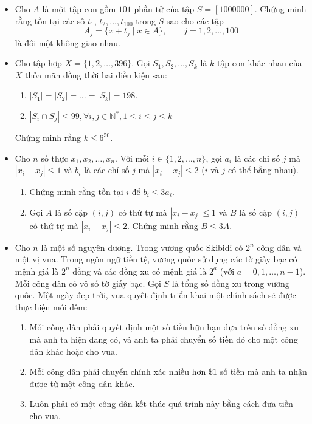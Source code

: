 \documentclass[11pt]{scrartcl}
\begin{document}
\begin{itemize}[label=, leftmargin=0em, itemsep=-0em]
    \item \begin{btvn}
        Cho $A$ là một tập con gồm $101$ phần tử của tập $S=[1000000]$. Chứng minh rằng tồn tại các số $t_1$, $t_2, \ldots, t_{100}$ trong $S$ sao cho các tập\[ A_j=\{x+t_j\mid x\in A\},\qquad j=1,2,\ldots,100  \]là đôi một không giao nhau.
    \end{btvn}
    \item \begin{btvn}
        Cho tập hợp $X = \{1,2,\dots,396\}$. Gọi $S_1,S_2,\dots,S_k$ là $k$ tập con khác nhau của $X$ thỏa mãn đồng thời hai điều kiện sau:
        \begin{enumerate}
            \item $|S_1| = |S_2| = \dots = |S_k| = 198$.
            \item $|S_i \cap S_j| \leq 99, \forall i,j \in \mathbb{N}^*, 1 \leq i \leq j \leq k$
        \end{enumerate}
        Chứng minh rằng $k \leq 6^{50}$.
    \end{btvn}
    \item \begin{btvn}
        Cho $n$ số thực $x_1, x_2,\dots,x_n$. Với mỗi $i \in \{1,2,\dots,n\}$, gọi $a_i$ là các chỉ số $j$ mà $|x_i  - x_j| \leq 1$ và $b_i$ là các chỉ số $j$ mà $|x_i - x_j| \leq 2$ ($i$ và $j$ có thể bằng nhau).
        \begin{enumerate}
            \item Chứng minh rằng tồn tại $i$ để $b_i \leq 3a_i$.
            \item Gọi $A$ là số cặp $(i,j)$ có thứ tự mà $|x_i - x_j| \leq 1$ và $B$ là số cặp $(i,j)$ có thứ tự mà $|x_i - x_j| \leq 2$. Chứng minh rằng $B \leq 3A$.
        \end{enumerate}
    \end{btvn}
    \item\begin{btvn}
        Cho $n$ là một số nguyên dương. Trong vương quốc Skibidi có $2^n$ công dân và một vị vua. Trong ngôn ngữ tiền tệ, vương quốc sử dụng các tờ giấy bạc có mệnh giá là $2^n$ đồng và các đồng xu có mệnh giá là $2^a$ (với $a=0,1,\ldots,n-1$). Mỗi công dân có vô số tờ giấy bạc. Gọi $S$ là tổng số đồng xu trong vương quốc. Một ngày đẹp trời, vua quyết định triển khai một chính sách sẽ được thực hiện mỗi đêm:
        \begin{enumerate}
            \item Mỗi công dân phải quyết định một số tiền hữu hạn dựa trên số đồng xu mà anh ta hiện đang có, và anh ta phải chuyển số tiền đó cho một công dân khác hoặc cho vua.
            \item Mỗi công dân phải chuyển chính xác nhiều hơn $\$1$ số tiền mà anh ta nhận được từ một công dân khác. 
            \item Luôn phải có một công dân kết thúc quá trình này bằng cách đưa tiền cho vua.
        \end{enumerate}


\end{btvn}
\end{itemize}
\end{document}
